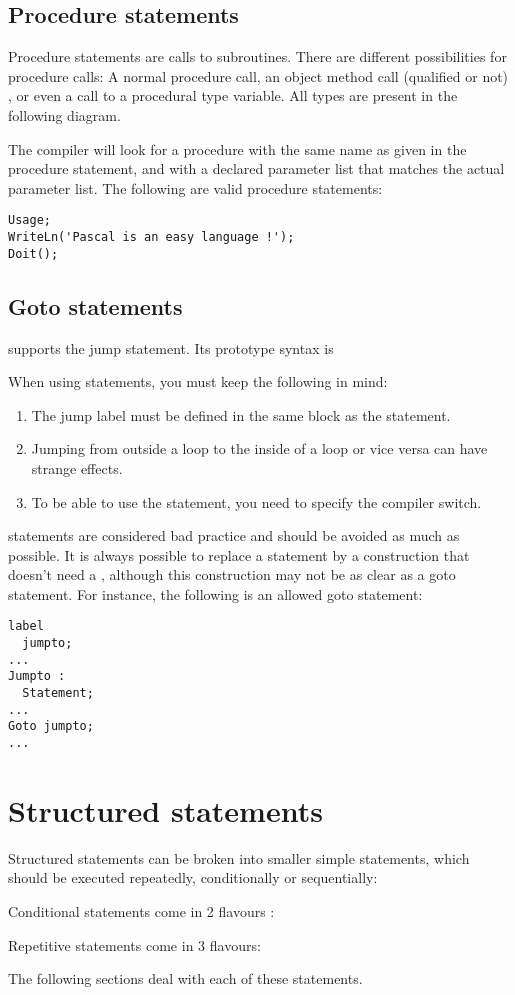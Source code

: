 \documentclass{report}
\begin{document}
\subsection{Procedure statements}
Procedure statements are calls to subroutines. There are
different possibilities for procedure calls: A normal procedure call, an
object method call (qualified or not) , or even a call to a procedural
type variable. All types are present in the following diagram.

The \fpc compiler will look for a procedure with the same name as given in
the procedure statement, and with a declared parameter list that matches the
actual parameter list.
The following are valid procedure statements:
\begin{verbatim}
Usage;
WriteLn('Pascal is an easy language !');
Doit();
\end{verbatim}
\subsection{Goto statements}
\fpc supports the  jump statement. Its prototype syntax is

When using  statements, you must keep the following in mind:
\begin{enumerate}
\item The jump label must be defined in the same block as the 
statement.
\item Jumping from outside a loop to the inside of a loop or vice versa can
 have strange effects.
\item To be able to use the  statement, you need to specify the
 compiler switch.
\end{enumerate}
 statements are considered bad practice and should be avoided as
much as possible. It is always possible to replace a  statement by a
construction that doesn't need a , although this construction may
not be as clear as a goto statement.
For instance, the following is an allowed goto statement:
\begin{verbatim}
label
  jumpto;
...
Jumpto :
  Statement;
...
Goto jumpto;
...
\end{verbatim}
\section{Structured statements}
Structured statements can be broken into smaller simple statements, which
should be executed repeatedly, conditionally  or sequentially:

Conditional statements come in 2 flavours :

Repetitive statements come in 3 flavours:

The following sections deal with each of these statements.
\end{document}
